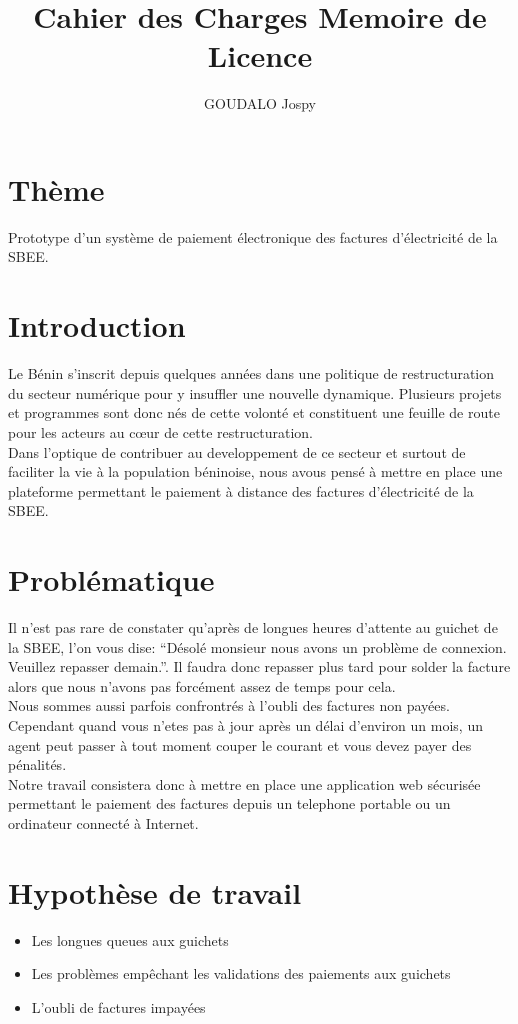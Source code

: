 \documentclass[a4paper,11pt]{article}
\title{Cahier des Charges Memoire de Licence}
\author{GOUDALO Jospy}
\begin{document}
\maketitle
\vspace{4cm}
\tableofcontents
\newpage

\section*{Th\`eme}
  Prototype d'un syst\`eme de paiement \'electronique des factures d'\'electricit\'e de la SBEE.

\section*{Introduction}
  Le Bénin s’inscrit depuis quelques années dans une politique de restructuration du secteur numérique pour y insuffler une nouvelle dynamique. Plusieurs projets et programmes sont donc nés de cette volonté et constituent une feuille de route pour les acteurs au cœur de cette restructuration. 
  \\Dans l'optique de contribuer au developpement de ce secteur et surtout de faciliter la vie \`a la population b\'eninoise, nous avous pens\'e \`a mettre en place une plateforme permettant le paiement \`a distance des factures d'\'electricit\'e de la SBEE.
  
\section{Problématique}
  Il n'est pas rare de constater qu'apr\`es de longues heures d'attente au guichet de la SBEE, l'on vous dise: ``D\'esol\'e monsieur nous avons un probl\`eme de connexion. Veuillez repasser demain.''. Il faudra donc repasser plus tard pour solder la facture alors que nous n'avons pas forc\'ement assez de temps pour cela. \\
  Nous sommes aussi parfois confrontr\'es \`a l'oubli des factures non pay\'ees. Cependant quand vous n'etes pas \`a jour apr\`es un d\'elai d'environ un mois, un agent peut passer \`a tout moment couper le courant et vous devez payer des p\'enalit\'es.\\
  Notre travail consistera donc \`a mettre en place une application web s\'ecuris\'ee permettant le paiement des factures depuis un telephone portable ou un ordinateur connect\'e \`a Internet.

 \section{Hypothèse de travail}
     \begin{itemize}
       \item Les longues queues aux guichets
       \item Les probl\`emes emp\^echant les validations des paiements aux guichets
       \item L'oubli de factures impay\'ees
     \end{itemize}
\end{document}
